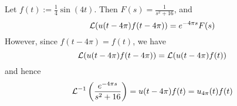 \label{c8f0f6e}

Let $f(t):=\frac14\sin(4t)$. Then $F(s)=\frac1{s^2+16}$, and
$$
	\mathcal L(u(t-4\pi)f(t-4\pi))=e^{-4\pi s}F(s)
$$
However, since $f(t-4\pi)=f(t)$, we have
$$
	\mathcal L(u(t-4\pi)f(t-4\pi))=\mathcal L(u(t-4\pi)f(t))
$$
and hence
$$
	\mathcal L^{-1}\left(\frac{e^{-4\pi s}}{s^2+16}\right)=u(t-4\pi)f(t) = u_{4\pi}(t)f(t)
$$

